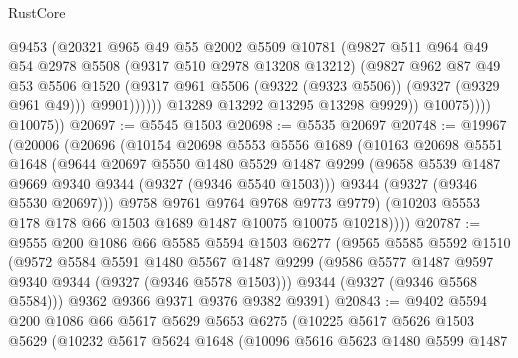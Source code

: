 \begin{lexlean}{RustCore}
\begin{coremodule}
                          @9453
                          (@20321
                            @965
                            @49
                            @55
                            @2002
                            @5509
                            @10781
                            (@9827
                              @511
                              @964
                              @49
                              @54
                              @2978
                              @5508
                              (@9317 @510 @2978 @13208 @13212)
                              (@9827
                                @962
                                @87
                                @49
                                @53
                                @5506
                                @1520
                                (@9317 @961 @5506 (@9322 (@9323 @5506)) (@9327 (@9329 @961 @49)))
                                @9901))))))
                    @13289
                    @13292
                    @13295
                    @13298
                    @9929))
                @10075))))
        @10075))
@20697 := @5545 @1503
@20698 := @5535 @20697
@20748 := @19967
    (@20006
      (@20696
        (@10154
          @20698
          @5553
          @5556
          @1689
          (@10163
            @20698
            @5551
            @1648
            (@9644
              @20697
              @5550
              @1480
              @5529
              @1487
              @9299
              (@9658 @5539 @1487 @9669 @9340 @9344 (@9327 (@9346 @5540 @1503)))
              @9344
              (@9327 (@9346 @5530 @20697)))
            @9758
            @9761
            @9764
            @9768
            @9773
            @9779)
          (@10203 @5553 @178 @178 @66 @1503 @1689 @1487 @10075 @10075 @10218))))
@20787 := @9555
    @200
    @1086
    @66
    @5585
    @5594
    @1503
    @6277
    (@9565
      @5585
      @5592
      @1510
      (@9572
        @5584
        @5591
        @1480
        @5567
        @1487
        @9299
        (@9586 @5577 @1487 @9597 @9340 @9344 (@9327 (@9346 @5578 @1503)))
        @9344
        (@9327 (@9346 @5568 @5584)))
      @9362
      @9366
      @9371
      @9376
      @9382
      @9391)
@20843 := @9402
    @5594
    @200
    @1086
    @66
    @5617
    @5629
    @5653
    @6275
    (@10225
      @5617
      @5626
      @1503
      @5629
      (@10232
        @5617
        @5624
        @1648
        (@10096
          @5616
          @5623
          @1480
          @5599
          @1487

\end{coremodule}
\end{lexlean}
